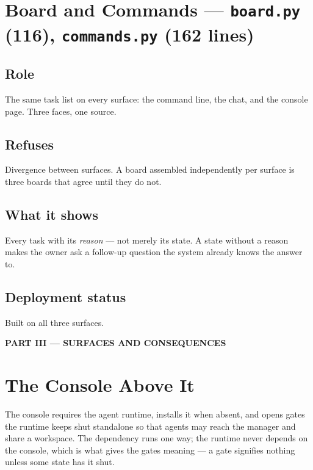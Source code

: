 \documentclass[11pt]{article}
\newcommand{\code}[1]{\texttt{\small #1}}
\begin{document}
\section{Board and Commands --- \code{board.py} (116), \code{commands.py} (162 lines)}
\label{sec:board}

\subsection{Role}

The same task list on every surface: the command line, the chat, and the console page. Three faces, one source.

\subsection{Refuses}

Divergence between surfaces. A board assembled independently per surface is three boards that agree until they do not.

\subsection{What it shows}

Every task with its \emph{reason} --- not merely its state. A state without a reason makes the owner ask a follow-up question the system already knows the answer to.

\subsection{Deployment status}

Built on all three surfaces.

\newpage
\begin{center}\large\bfseries PART III --- SURFACES AND CONSEQUENCES\end{center}

\section{The Console Above It}
\label{sec:console}

The console requires the agent runtime, installs it when absent, and opens gates the runtime keeps shut standalone so that agents may reach the manager and share a workspace. The dependency runs one way; the runtime never depends on the console, which is what gives the gates meaning --- a gate signifies nothing unless some state has it shut.
\end{document}
